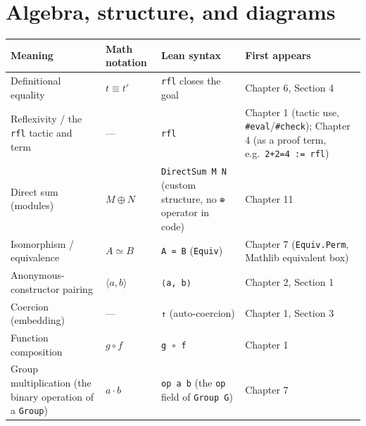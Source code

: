 \section*{Algebra, structure, and diagrams}
\label{sec:root:notation-reference:3}

\begin{longtable}[]{@{}
  >{\raggedright\arraybackslash}p{}
  >{\raggedright\arraybackslash}p{}
  >{\raggedright\arraybackslash}p{}
  >{\raggedright\arraybackslash}p{}@{}}
\toprule\noalign{}
\begin{minipage}[b]{\linewidth}\raggedright
Meaning
\end{minipage} & \begin{minipage}[b]{\linewidth}\raggedright
Math notation
\end{minipage} & \begin{minipage}[b]{\linewidth}\raggedright
Lean syntax
\end{minipage} & \begin{minipage}[b]{\linewidth}\raggedright
First appears
\end{minipage} \\
\midrule\noalign{}
\endhead
\bottomrule\noalign{}
\endlastfoot
Definitional equality & \(t \equiv t'\) & \texttt{rfl} closes the goal & Chapter 6, Section 4 \\
Reflexivity / the \texttt{rfl} tactic and term & --- & \texttt{rfl} & Chapter 1 (tactic use, \texttt{\#eval}/\texttt{\#check}); Chapter 4 (as a proof term, e.g.~\texttt{2+2=4 := rfl}) \\
Direct sum (modules) & \(M \oplus N\) & \texttt{DirectSum M N} (custom structure, no \texttt{⊕} operator in code) & Chapter 11 \\
Isomorphism / equivalence & \(A \simeq B\) & \texttt{A ≃ B} (\texttt{Equiv}) & Chapter 7 (\texttt{Equiv.Perm}, Mathlib equivalent box) \\
Anonymous-constructor pairing & \(\langle a, b \rangle\) & \texttt{⟨a, b⟩} & Chapter 2, Section 1 \\
Coercion (embedding) & --- & \texttt{↑} (auto-coercion) & Chapter 1, Section 3 \\
Function composition & \(g \circ f\) & \texttt{g ∘ f} & Chapter 1 \\
Group multiplication (the binary operation of a \texttt{Group}) & \(a \cdot b\) & \texttt{op a b} (the \texttt{op} field of \texttt{Group G}) & Chapter 7 \\

\end{longtable}

